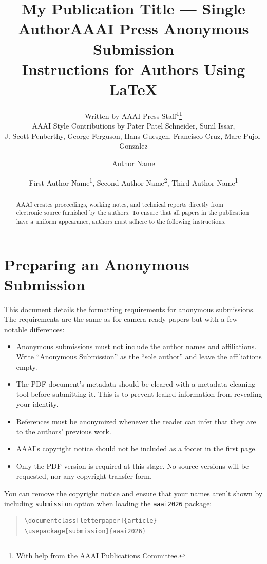 \documentclass[letterpaper]{article} %
\author{
    Written by AAAI Press Staff\textsuperscript{\rm 1}\thanks{With help from the AAAI Publications Committee.}\\
    AAAI Style Contributions by Pater Patel Schneider,
    Sunil Issar,\\
    J. Scott Penberthy,
    George Ferguson,
    Hans Guesgen,
    Francisco Cruz\equalcontrib,
    Marc Pujol-Gonzalez\equalcontrib
}
\title{My Publication Title --- Single Author}
\author {
    Author Name
}
\author {
    First Author Name\textsuperscript{\rm 1},
    Second Author Name\textsuperscript{\rm 2},
    Third Author Name\textsuperscript{\rm 1}
}
\title{AAAI Press Anonymous Submission\\
Instructions for Authors Using {\LaTeX}}
\author{}
\date{}
\begin{document}
\maketitle
\begin{abstract}
AAAI creates proceedings, working notes, and technical reports directly
from electronic source furnished by the authors. To ensure that all
papers in the publication have a uniform appearance, authors must adhere
to the following instructions.
\end{abstract}
\section{Preparing an Anonymous
Submission}\label{preparing-an-anonymous-submission}

This document details the formatting requirements for anonymous
submissions. The requirements are the same as for camera ready papers
but with a few notable differences:

\begin{itemize}
\tightlist
\item
  Anonymous submissions must not include the author names and
  affiliations. Write ``Anonymous Submission'' as the ``sole author''
  and leave the affiliations empty.
\item
  The PDF document's metadata should be cleared with a metadata-cleaning
  tool before submitting it. This is to prevent leaked information from
  revealing your identity.
\item
  References must be anonymized whenever the reader can infer that they
  are to the authors' previous work.
\item
  AAAI's copyright notice should not be included as a footer in the
  first page.
\item
  Only the PDF version is required at this stage. No source versions
  will be requested, nor any copyright transfer form.
\end{itemize}

You can remove the copyright notice and ensure that your names aren't
shown by including \texttt{submission} option when loading the
\texttt{aaai2026} package:

\begin{quote}\begin{scriptsize}\begin{verbatim}
\documentclass[letterpaper]{article}
\usepackage[submission]{aaai2026}
\end{verbatim}\end{scriptsize}\end{quote}
\end{document}
